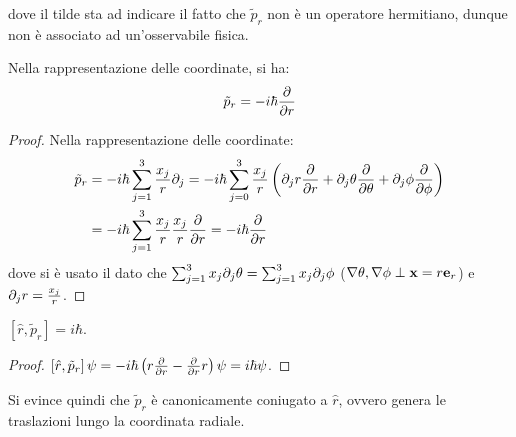 dove il tilde sta ad indicare il fatto che $ \tilde{p}_r $ non è un operatore hermitiano, dunque non è associato ad un'osservabile fisica.

\begin{proposition}
	Nella rappresentazione delle coordinate, si ha:
	\begin{equation}
		\tilde{p}_r = - i \hbar \frac{\partial}{\partial r}
		\label{eq:30}
	\end{equation}
\end{proposition}
\begin{proof}
	Nella rappresentazione delle coordinate:
	\begin{equation*}
		\begin{split}
			\tilde{p}_r &= -i\hbar \sum_{j = 1}^{3} \frac{x_j}{r} \partial_j = -i\hbar \sum_{j = 0}^{3} \frac{x_j}{r} \left(\partial_j r \frac{\partial}{\partial r} + \partial_j \theta \frac{\partial}{\partial \theta} + \partial_j \phi \frac{\partial}{\partial \phi}\right)\\
				    &= -i\hbar \sum_{j = 1}^{3} \frac{x_j}{r} \frac{x_j}{r} \frac{\partial}{\partial r} = -i\hbar \frac{\partial}{\partial r}
		\end{split}
	\end{equation*}
	dove si è usato il dato che $ \sum_{j = 1}^{3} x_j \partial_j \theta = \sum_{j = 1}^{3} x_j \partial_j \phi $ ($ \nabla\theta, \nabla\phi \perp \mathbf{x} = r\mathbf{e}_r $) e $ \partial_j r = \frac{x_j}{r} $.
\end{proof}

\begin{proposition}
	$ \left[\hat{r}, \tilde{p}_r\right] = i\hbar $.
\end{proposition}
\begin{proof}
	$ \left[\hat{r}, \tilde{p}_r\right]\psi = -i\hbar \left(r \frac{\partial}{\partial r} - \frac{\partial}{\partial r}r\right)\psi = i\hbar\psi $.
\end{proof}

Si evince quindi che $ \tilde{p}_r $ è canonicamente coniugato a $ \hat{r} $, ovvero genera le traslazioni lungo la coordinata radiale.











